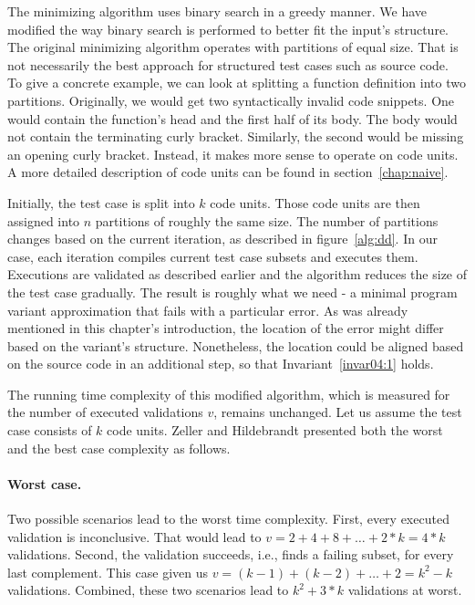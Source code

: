 The minimizing algorithm uses binary search in a greedy manner.
We have modified the way binary search is performed to better fit the input's
structure.
The original minimizing algorithm operates with partitions of equal size.
That is not necessarily the best approach for structured test cases such
as source code.
To give a concrete example, we can look at splitting a function definition
into two partitions.
Originally, we would get two syntactically invalid code snippets.
One would contain the function's head and the first half of its body.
The body would not contain the terminating curly bracket.
Similarly, the second would be missing an opening curly bracket.
Instead, it makes more sense to operate on code units.
A more detailed description of code units can be found in 
section~\ref{chap:naive}.

Initially, the test case is split into $k$ code units.
Those code units are then assigned into $n$ partitions of roughly the same 
size.
The number of partitions changes based on the current iteration, as described
in figure~\ref{alg:dd}.
In our case, each iteration compiles current test case subsets and executes 
them.
Executions are validated as described earlier and the algorithm reduces
the size of the test case gradually.
The result is roughly what we need - a minimal program variant approximation 
that fails with a particular error.
As was already mentioned in this chapter's introduction, the location of 
the error might differ based on the variant's structure.
Nonetheless, the location could be aligned based on the source code in 
an additional step, so that Invariant~\ref{invar04:1} holds.

The running time complexity of this modified algorithm, which is measured 
for the number of executed validations $v$, remains unchanged. 
Let us assume the test case consists of $k$ code units. 
Zeller and Hildebrandt\citep*{Zeller02} presented both the worst 
and the best case complexity as follows.

\paragraph{Worst case.} Two possible scenarios lead to the worst time 
complexity. 
First, every executed validation is inconclusive. 
That would lead to $v = 2 + 4 + 8 + \ldots + 2 * k = 4 * k$ validations. 
Second, the validation succeeds, i.e., finds a failing subset, for every 
last complement. 
This case given us $v = (k - 1) + (k - 2) + \ldots + 2 = k^2 - k$ validations.
Combined, these two scenarios lead to $k^2 + 3 * k$ validations at worst.

